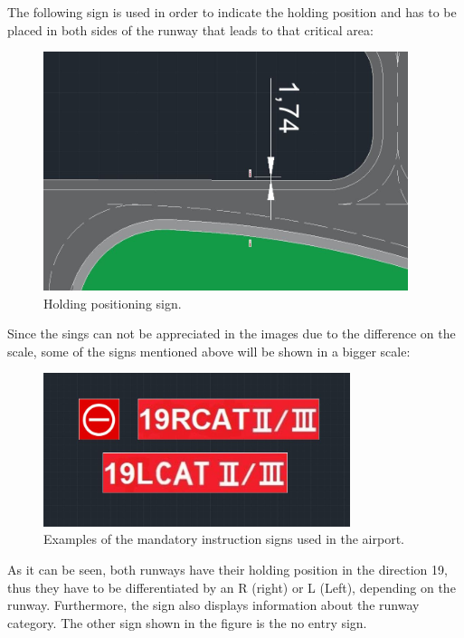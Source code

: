 	The following sign is used in order to indicate the holding position and has to be placed in both sides of the runway that leads to that critical area:
	
	\begin{figure}[H]
		\centering
		\includegraphics[clip, trim=0cm 0cm 0cm 0cm, width=0.95\textwidth]{./images/signsexamples/holdingposition}
		\caption{Holding positioning sign.} %
		\label{} %
	\end{figure}
	
	Since the sings can not be appreciated in the images due to the difference on the scale, some of the signs mentioned above will be shown in a bigger scale:
	
	\begin{figure}[H]
		\centering
		\includegraphics[clip, trim=0cm 0cm 0cm 0cm, width=0.8\textwidth]{./images/signsexamples/examples}
		\caption{Examples of the mandatory instruction signs used in the airport.} %
		\label{} %
	\end{figure}
	
	As it can be seen, both runways have their holding position in the direction 19, thus they have to be differentiated by an R (right) or L (Left), depending on the runway. Furthermore, the sign also displays information about the runway category. The other sign shown in the figure is the no entry sign.
	
